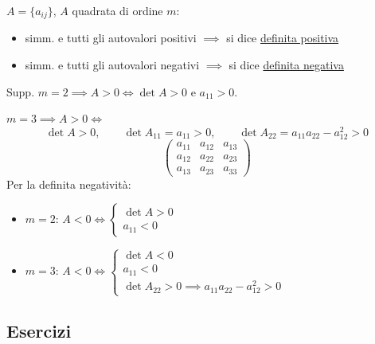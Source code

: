 \begin{definition}
$A = \{ a_{ij} \}$, $A$ quadrata di ordine $m$:
\begin{itemize}
    \item simm. e tutti gli autovalori positivi $\implies$ si dice \underline{definita positiva}
    \item simm. e tutti gli autovalori negativi $\implies$ si dice \underline{definita negativa}
\end{itemize}
Supp. $m = 2 \implies A > 0 \iff \det A > 0$ e $a_{11} > 0$.

$m = 3 \implies A > 0 \iff$
\[
\det A > 0, \qquad \det A_{11} = a_{11} > 0, \qquad \det A_{22} = a_{11} a_{22} - a_{12}^2 > 0
\]
\[
\begin{pmatrix}
\boxed{a_{11}} & a_{12} & a_{13} \\
a_{12} & a_{22} & a_{23} \\
a_{13} & a_{23} & a_{33}
\end{pmatrix}
\]
Per la definita negatività:
\begin{itemize}
    \item $m = 2$: $A < 0 \iff \begin{cases} \det A > 0 \\ a_{11} < 0 \end{cases}$
        \item $m = 3$: $A < 0 \iff \begin{cases} \det A < 0 \\ a_{11} < 0 \\ \det A_{22} > 0 \implies a_{11} a_{22} - a_{12}^2 > 0 \end{cases}$
\end{itemize}
\end{definition}

\subsection{Esercizi}

